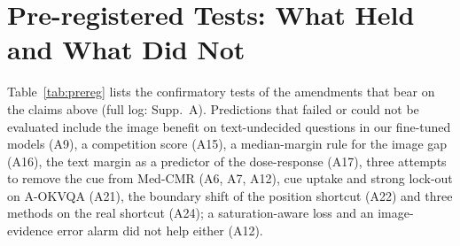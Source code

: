 \section{Pre-registered Tests: What Held and What Did Not}
\label{sec:outcomes}

Table~\ref{tab:prereg} lists the confirmatory tests of the amendments that bear on the claims above (full log: Supp.~A).
Predictions that failed or could not be evaluated include the image benefit on text-undecided questions in our fine-tuned models (A9), a competition score (A15), a median-margin rule for the image gap (A16), the text margin as a predictor of the dose-response (A17), three attempts to remove the cue from Med-CMR (A6, A7, A12), cue uptake and strong lock-out on A-OKVQA (A21), the boundary shift of the position shortcut (A22) and three methods on the real shortcut (A24); a saturation-aware loss and an image-evidence error alarm did not help either (A12).

